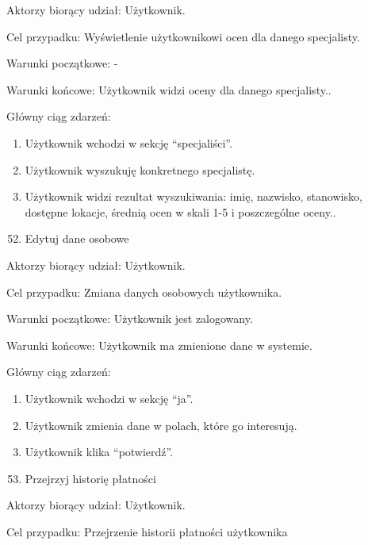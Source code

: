 {Aktorzy biorący udział: Użytkownik.}

{Cel przypadku: Wyświetlenie użytkownikowi ocen dla danego specjalisty.}

{Warunki początkowe: -}

{Warunki końcowe: Użytkownik widzi oceny dla danego specjalisty..}

{Główny ciąg zdarzeń:}

\begin{enumerate}
\tightlist
\item
  {Użytkownik wchodzi w sekcję ``specjaliści''.}
\item
  {Użytkownik wyszukuję konkretnego specjalistę.}
\item
  {Użytkownik widzi rezultat wyszukiwania: imię, nazwisko, stanowisko,
  dostępne lokacje, średnią ocen w skali 1-5 i poszczególne oceny..}
\end{enumerate}

{}

\begin{enumerate}
\setcounter{enumi}{51}
\tightlist
\item
  {Edytuj dane osobowe}
\end{enumerate}

{Aktorzy biorący udział: Użytkownik.}

{Cel przypadku: Zmiana danych osobowych użytkownika.}

{Warunki początkowe: Użytkownik jest zalogowany.}

{Warunki końcowe: Użytkownik ma zmienione dane w systemie.}

{Główny ciąg zdarzeń:}

\begin{enumerate}
\tightlist
\item
  {Użytkownik wchodzi w sekcję ``ja''.}
\item
  {Użytkownik zmienia dane w polach, które go interesują.}
\item
  {Użytkownik klika ``potwierdź''.}
\end{enumerate}

{}

\begin{enumerate}
\setcounter{enumi}{52}
\tightlist
\item
  {Przejrzyj historię płatności}
\end{enumerate}

{Aktorzy biorący udział: Użytkownik.}

{Cel przypadku: Przejrzenie historii płatności użytkownika}


